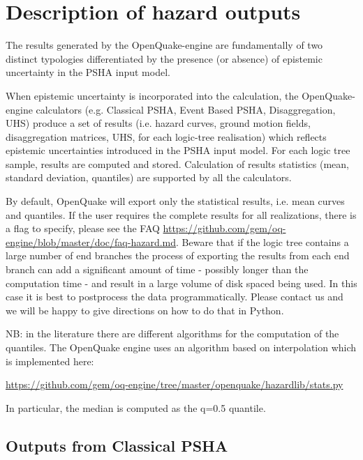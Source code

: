 \section{Description of hazard outputs}
\label{sec:hazard_outputs}

The results generated by the OpenQuake-engine are fundamentally of two
distinct typologies differentiated by the presence (or absence) of epistemic
uncertainty in the PSHA input model.

When epistemic uncertainty is incorporated into the calculation, the
OpenQuake-engine calculators (e.g. Classical PSHA, Event Based PSHA,
Disaggregation, UHS) produce a set of results (i.e. hazard curves, ground
motion fields, disaggregation matrices, UHS, for each logic-tree realisation)
which reflects epistemic uncertainties introduced in the PSHA input model.
For each logic tree sample, results are computed and stored. Calculation of
results statistics (mean, standard deviation, quantiles) are supported by all
the calculators.

By default, OpenQuake will export only the statistical results, i.e. mean
curves and quantiles. If the user requires the complete results for all
realizations, there is a flag to specify, please see the FAQ \href{https://github.com/gem/oq-engine/blob/master/doc/faq-hazard.md}{https://github.com/gem/oq-engine/blob/master/doc/faq-hazard.md}.
Beware that if the logic tree contains a large number of end branches the
process of exporting the results from each end branch can add a significant
amount of time - possibly longer than the computation time - and result in a
large volume of disk spaced being used. In this case it is best to postprocess
the data programmatically. Please contact us and we will be happy to give
directions on how to do that in Python.

NB: in the literature there are different algorithms for the computation
of the quantiles. The OpenQuake engine uses an algorithm based on interpolation
which is implemented here:

\href{https://github.com/gem/oq-engine/tree/master/openquake/hazardlib/stats.py}{https://github.com/gem/oq-engine/tree/master/openquake/hazardlib/stats.py}

In particular, the median is computed as the q=0.5 quantile.

\subsection{Outputs from Classical PSHA}
\label{subsec:output_classical_psha}


